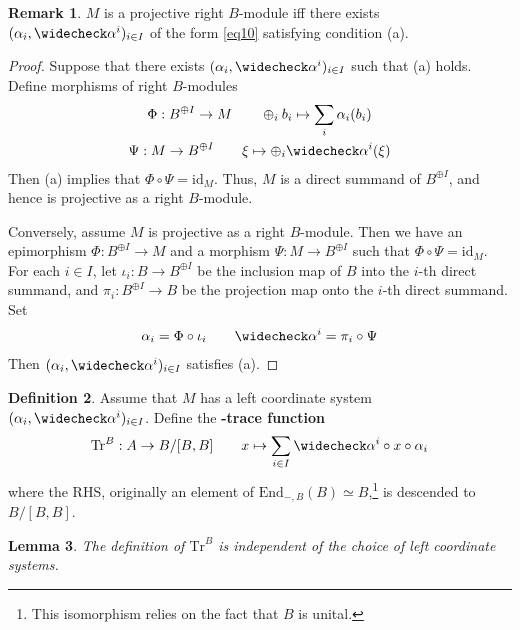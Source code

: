 \documentclass[11pt,b5paper,notitlepage]{article}
\theoremstyle{definition}
\newtheorem{df}{Definition}[section]
\newtheorem{rem}[df]{Remark}
\theoremstyle{plain}
\newtheorem{lm}[df]{Lemma}
\newcommand{\wch}{\widecheck}
\newcommand{\Tr}{\mathrm{Tr}}
\newcommand{\End}{\mathrm{End}} %
\newcommand{\id}{\mathrm{id}}
\numberwithin{equation}{section}
\begin{document}
\begin{rem}\label{lb20}
$M$ is a projective right $B$-module iff there exists $(\alpha_i,\wch\alpha^i)_{i\in I}$ of the form \eqref{eq10} satisfying condition (a).
\end{rem}
\begin{proof}
	Suppose that there exists $(\alpha_i,\wch\alpha^i)_{i\in I}$ such that (a) holds. Define morphisms of right $B$-modules
\begin{gather*}
\Phi:B^{\oplus I}\rightarrow M\qquad \oplus_i b_i\mapsto \sum_i \alpha_i(b_i)\\
\Psi:M\rightarrow B^{\oplus I}\qquad \xi\mapsto \oplus_i\wch\alpha^i(\xi)
\end{gather*}
Then (a) implies that $\Phi\circ \Psi=\id_M$. Thus, $M$ is a direct summand of $B^{\oplus I}$, and hence is projective as a right $B$-module.

Conversely, assume $M$ is projective as a right $B$-module. Then we have an epimorphism $\Phi:B^{\oplus I}\rightarrow M$ and a morphism $\Psi:M\rightarrow  B^{\oplus I}$ such that $\Phi\circ \Psi=\id_M$. For each $i\in I$, let $\iota_{i}:B\rightarrow B^{\oplus I}$ be the inclusion map of $B$ into the $i$-th direct summand, and $\pi_i:B^{\oplus I}\rightarrow B$ be the projection map onto the $i$-th direct summand. Set 
	\begin{align*}
		\alpha_i=\Phi \circ \iota_i\qquad \wch \alpha^i=\pi_i\circ \Psi
	\end{align*}
Then $(\alpha_i,\wch\alpha^i)_{i\in I}$ satisfies (a).
\end{proof}



\begin{df}
Assume that $M$ has a left coordinate system $(\alpha_i,\wch\alpha^i)_{i\in I}$. Define the  \textbf{-trace function}
\begin{gather*}
\Tr^B:A\rightarrow B/[B,B]\qquad x\mapsto \sum_{i\in I}\wch\alpha^i\circ x\circ\alpha_i
\end{gather*}
where the RHS, originally an element of $\End_{-,B}(B)\simeq B$,\footnote{This isomorphism relies on the fact that $B$ is unital.} is descended to $B/[B,B]$.
\end{df}

\begin{lm}\label{lb9}
The definition of $\Tr^B$ is independent of the choice of left coordinate systems.
\end{lm}
\end{document}

